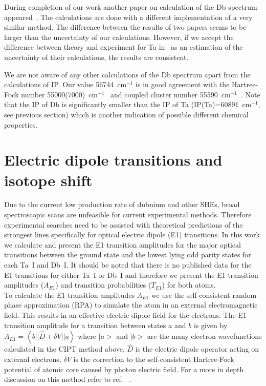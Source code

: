 \documentclass[10pt,a4paper, twoside]{report}
\begin{document}
During completion of our work another paper on calculation of the Db spectrum appeared~\cite{Geddes2018}.
The calculations are done with a different implementation of a very similar method. The difference between the results 
of two papers seems to be larger than the uncertainty of our calculations. However, if we accept the difference between 
theory and experiment for Ta in~\cite{Geddes2018} as an estimation of the uncertainty of their calculations, the results
are consistent.

We are not aware of any other calculations of the Db spectrum apart from the calculations of IP. Our value 56744~cm$^{-1}$ is in good agreement with the Hartree-Fock number 55000(7000)~cm$^{-1}$~\cite{Dzuba2016} and
coupled cluster number 55590~cm$^{-1}$~\cite{BorschevskyPC}. Note that the IP of Db is significantly smaller than the IP
of Ta (IP(Ta)=60891~cm$^{-1}$, see previous section) which is another indication of possible different chemical properties. 

\section{Electric dipole transitions and isotope shift} \label{sec:E1transitions}

Due to the current low production rate of dubnium and other SHEs, broad spectroscopic scans are unfeasible for current experimental methods. Therefore experimental searches need to be assisted with theoretical predictions of the strongest lines specifically for optical electric dipole (E1) transitions. In this work we calculate and present the E1 transition amplitudes for the major optical  transitions between the ground state and the  lowest lying odd parity states for each Ta~I and Db~I. It should be noted that there is no published data for the E1 transitions for either Ta~I or Db~I and therefore we present the E1 transition amplitudes ($A_{E1}$)  and transition probabilities ($T_{E1}$) for both atoms. \\

To calculate the E1 transition amplitudes $A_{E1}$ we use the self-consistent random-phase approximation (RPA) to simulate the atom in an external electromagnetic field. This results in an effective electric dipole field for the electrons. The E1 transition amplitude for a transition between states $a$ and $b$ is given by $A_{E1} = \left< b || \hat D + \delta V || a\right>$ where $|a>$ and $|b>$ are the many electron wavefunctions calculated in the CIPT method above, $\hat D$ is the electric dipole operator acting on external electrons, $\delta V$ is the correction to the self-consistent Hartree-Fock potential of atomic core caused by photon electric field. For a more in depth discussion on this method refer to ref. ~\cite{Dzuba2018}. \\
\end{document}

